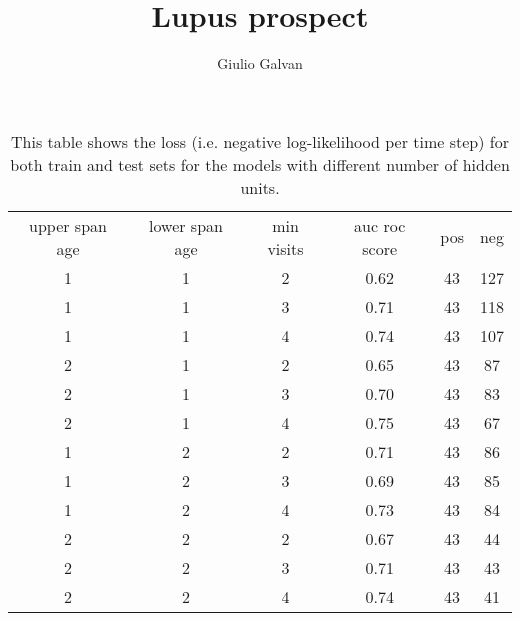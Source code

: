 \documentclass{article}
\title{Lupus prospect}
\author{Giulio Galvan}
\begin{document}
\begin{table}
	\centering
	\begin{tabular}{c  c  c | c  c c}
		upper span age & lower span age & min visits & auc roc score & pos & neg\\
		1 & 1 & 2  & 0.62 & 43 & 127\\
		1 & 1 & 3  & 0.71 & 43 & 118\\
		1 & 1 & 4  & 0.74 & 43 & 107\\
		2 & 1 & 2  & 0.65 & 43 & 87\\
		2 & 1 & 3  & 0.70 & 43 & 83\\
		2 & 1 & 4  & 0.75 & 43 & 67\\
		1 & 2 & 2  & 0.71 & 43 & 86\\
		1 & 2 & 3  & 0.69 & 43 & 85\\
		1 & 2 & 4  & 0.73 & 43 & 84\\
		2 & 2 & 2  & 0.67 & 43 & 44\\
		2 & 2 & 3  & 0.71 & 43 & 43\\
		2 & 2 & 4  & 0.74 & 43 & 41\\
	\end{tabular}
	\caption{This table shows the loss (i.e. negative log-likelihood per time step) for both train and test sets for the models with different number of hidden units.}
	\label{table:losses_n_hidden}
\end{table}
\end{document}

